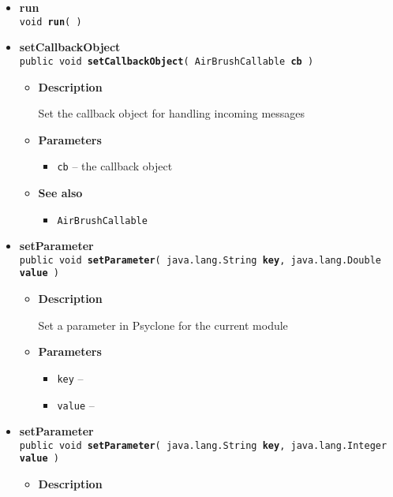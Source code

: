 {{{\begin{itemize}
{\begin{itemize}
{Post a message to Psyclone
}
\item{
{\bf Parameters}
  \begin{itemize}
   \item{
{\tt msg} -- }
  \end{itemize}
}%
\end{itemize}
}%
 \item{ 
{\bf run}\\
{\tt  void\ {\bf run}(  )
\label{amber.common.AirBrush.run()}}%
}%
 \item{ 
{\bf setCallbackObject}\\
{\tt public void\ {\bf setCallbackObject}( {\tt AirBrushCallable} {\bf cb} )
\label{amber.common.AirBrush.setCallbackObject(amber.common.AirBrushCallable)}}%
\begin{itemize}
\item{
{\bf Description}

Set the callback object for handling incoming messages
}
\item{
{\bf Parameters}
  \begin{itemize}
   \item{
{\tt cb} -- the callback object}
  \end{itemize}
}%
\item{{\bf See also}
  \begin{itemize}
\item{ {\tt AirBrushCallable} {\small 
{}}%
}
  \end{itemize}
}%
\end{itemize}
}%
 \item{ 
{\bf setParameter}\\
{\tt public void\ {\bf setParameter}( {\tt java.lang.String} {\bf key},
{\tt java.lang.Double} {\bf value} )
\label{amber.common.AirBrush.setParameter(java.lang.String, java.lang.Double)}}%
\begin{itemize}
\item{
{\bf Description}

Set a parameter in Psyclone for the current module
}
\item{
{\bf Parameters}
  \begin{itemize}
   \item{
{\tt key} -- }
   \item{
{\tt value} -- }
  \end{itemize}
}%
\end{itemize}
}%
 \item{ 
{\bf setParameter}\\
{\tt public void\ {\bf setParameter}( {\tt java.lang.String} {\bf key},
{\tt java.lang.Integer} {\bf value} )
\label{amber.common.AirBrush.setParameter(java.lang.String, java.lang.Integer)}}%
\begin{itemize}
\item{
{\bf Description}

}
\end{itemize}}
\end{itemize}}}}
